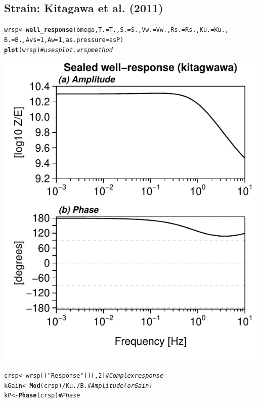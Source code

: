 \documentclass[12pt]{article}\usepackage[]{graphicx}\usepackage[]{color}
\makeatletter
\def\maxwidth{ %
  \ifdim\Gin@nat@width>\linewidth
    \linewidth
  \else
    \Gin@nat@width
  \fi
}
\newcommand{\hlnum}[1]{\textcolor[rgb]{0.686,0.059,0.569}{#1}}%
\newcommand{\hlstr}[1]{\textcolor[rgb]{0.192,0.494,0.8}{#1}}%
\newcommand{\hlcom}[1]{\textcolor[rgb]{0.678,0.584,0.686}{\textit{#1}}}%
\newcommand{\hlopt}[1]{\textcolor[rgb]{0,0,0}{#1}}%
\newcommand{\hlstd}[1]{\textcolor[rgb]{0.345,0.345,0.345}{#1}}%
\newcommand{\hlkwb}[1]{\textcolor[rgb]{0.69,0.353,0.396}{#1}}%
\newcommand{\hlkwc}[1]{\textcolor[rgb]{0.333,0.667,0.333}{#1}}%
\newcommand{\hlkwd}[1]{\textcolor[rgb]{0.737,0.353,0.396}{\textbf{#1}}}%
\newenvironment{kframe}{%
 \def\at@end@of@kframe{}%
 \ifinner\ifhmode%
  \def\at@end@of@kframe{\end{minipage}}%
  \begin{minipage}{\columnwidth}%
 \fi\fi%
 \def\FrameCommand##1{\hskip\@totalleftmargin \hskip-\fboxsep
 \colorbox{shadecolor}{##1}\hskip-\fboxsep
     \hskip-\linewidth \hskip-\@totalleftmargin \hskip\columnwidth}%
 \MakeFramed {\advance\hsize-\width
   \@totalleftmargin\z@ \linewidth\hsize
   \@setminipage}}%
 {\par\unskip\endMakeFramed%
 \at@end@of@kframe}
\newenvironment{knitrout}{}{} %
\makeatother
\begin{document}
\subsection{Strain: Kitagawa et al. (2011)}
%
\begin{knitrout}\small
{}\color{fgcolor}\begin{kframe}
\begin{alltt}
\hlstd{wrsp} \hlkwb{<-} \hlkwd{well_response}\hlstd{(omega,} \hlkwc{T.} \hlstd{= T.,} \hlkwc{S.} \hlstd{= S.,} \hlkwc{Vw.} \hlstd{= Vw.,} \hlkwc{Rs.} \hlstd{= Rs.,} \hlkwc{Ku.} \hlstd{= Ku.,}
    \hlkwc{B.} \hlstd{= B.,} \hlkwc{Avs} \hlstd{=} \hlnum{1}\hlstd{,} \hlkwc{Aw} \hlstd{=} \hlnum{1}\hlstd{,} \hlkwc{as.pressure} \hlstd{= asP)}
\hlkwd{plot}\hlstd{(wrsp)}  \hlcom{# uses plot.wrsp method}
\end{alltt}
\end{kframe}
\includegraphics[width=\maxwidth]{figure/KITRESP-1} 
\begin{kframe}\begin{alltt}
\hlstd{crsp} \hlkwb{<-} \hlstd{wrsp[[}\hlstr{"Response"}\hlstd{]][,} \hlnum{2}\hlstd{]}  \hlcom{# Complex response}
\hlstd{kGain} \hlkwb{<-} \hlkwd{Mod}\hlstd{(crsp)}\hlopt{/}\hlstd{Ku.}\hlopt{/}\hlstd{B.}  \hlcom{# Amplitude (or Gain)}
\hlstd{kP} \hlkwb{<-} \hlkwd{Phase}\hlstd{(crsp)}  \hlcom{# Phase}
\end{alltt}
\end{kframe}
\end{knitrout}
\end{document}
